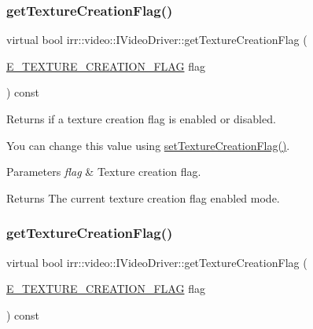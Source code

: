 \subsubsection{\texorpdfstring{get\+Texture\+Creation\+Flag()}{getTextureCreationFlag()}\hspace{0.1cm}{\footnotesize\ttfamily [1/2]}}
{\footnotesize\ttfamily virtual bool irr\+::video\+::\+I\+Video\+Driver\+::get\+Texture\+Creation\+Flag (\begin{DoxyParamCaption}\item[{\hyperlink{namespaceirr_1_1video_acaf6f7414534f7d62bff18c5bf11876f}{E\+\_\+\+T\+E\+X\+T\+U\+R\+E\+\_\+\+C\+R\+E\+A\+T\+I\+O\+N\+\_\+\+F\+L\+AG}}]{flag }\end{DoxyParamCaption}) const\hspace{0.3cm}{\ttfamily [pure virtual]}}



Returns if a texture creation flag is enabled or disabled. 

You can change this value using \hyperlink{classirr_1_1video_1_1IVideoDriver_a868b58a6b86b9e4841ca3879ce246c4e}{set\+Texture\+Creation\+Flag()}. 
\begin{DoxyParams}{Parameters}
{\em flag} & Texture creation flag. \\
\hline
\end{DoxyParams}
\begin{DoxyReturn}{Returns}
The current texture creation flag enabled mode. 
\end{DoxyReturn}
\mbox{\label{classirr_1_1video_1_1IVideoDriver_ae64d474cbca38f64f2dbb8fcacb1a035}} 
\subsubsection{\texorpdfstring{get\+Texture\+Creation\+Flag()}{getTextureCreationFlag()}\hspace{0.1cm}{\footnotesize\ttfamily [2/2]}}
{\footnotesize\ttfamily virtual bool irr\+::video\+::\+I\+Video\+Driver\+::get\+Texture\+Creation\+Flag (\begin{DoxyParamCaption}\item[{\hyperlink{namespaceirr_1_1video_acaf6f7414534f7d62bff18c5bf11876f}{E\+\_\+\+T\+E\+X\+T\+U\+R\+E\+\_\+\+C\+R\+E\+A\+T\+I\+O\+N\+\_\+\+F\+L\+AG}}]{flag }\end{DoxyParamCaption}) const\hspace{0.3cm}{\ttfamily [pure virtual]}}




